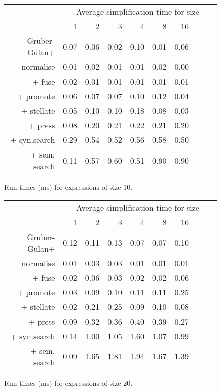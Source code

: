 \begin{figure}\begin{tabular}{rrrrrrrrrr}
 & \multicolumn{9}{c}{Average simplification time for size} \\
 & 1 & 2 & 3 & 4 & 8 & 16 \\
Gruber-Gulan+ & 0.07 & 0.06 & 0.02 & 0.10 & 0.01 & 0.06 \\
normalise & 0.01 & 0.02 & 0.01 & 0.01 & 0.02 & 0.00 \\
+ fuse & 0.02 & 0.01 & 0.01 & 0.01 & 0.01 & 0.01 \\
+ promote & 0.06 & 0.07 & 0.07 & 0.10 & 0.12 & 0.04 \\
+ stellate & 0.05 & 0.10 & 0.10 & 0.18 & 0.08 & 0.03 \\
+ press & 0.08 & 0.20 & 0.21 & 0.22 & 0.21 & 0.20 \\
+ syn.search & 0.29 & 0.54 & 0.52 & 0.56 & 0.58 & 0.50 \\
+ sem. search & 0.11 & 0.57 & 0.60 & 0.51 & 0.90 & 0.90 \\
\end{tabular}\caption{Run-times (ms) for expressions of size 10.}\end{figure}
\begin{figure}\begin{tabular}{rrrrrrrrrr}
 & \multicolumn{9}{c}{Average simplification time for size} \\
 & 1 & 2 & 3 & 4 & 8 & 16 \\
Gruber-Gulan+ & 0.12 & 0.11 & 0.13 & 0.07 & 0.07 & 0.10 \\
normalise & 0.01 & 0.03 & 0.03 & 0.01 & 0.01 & 0.01 \\
+ fuse & 0.02 & 0.06 & 0.03 & 0.02 & 0.02 & 0.06 \\
+ promote & 0.03 & 0.09 & 0.10 & 0.11 & 0.11 & 0.25 \\
+ stellate & 0.02 & 0.21 & 0.25 & 0.09 & 0.10 & 0.08 \\
+ press & 0.09 & 0.32 & 0.36 & 0.40 & 0.39 & 0.27 \\
+ syn.search & 0.14 & 1.00 & 1.05 & 1.60 & 1.07 & 0.99 \\
+ sem. search & 0.09 & 1.65 & 1.81 & 1.94 & 1.67 & 1.39 \\
\end{tabular}\caption{Run-times (ms) for expressions of size 20.}\end{figure}
